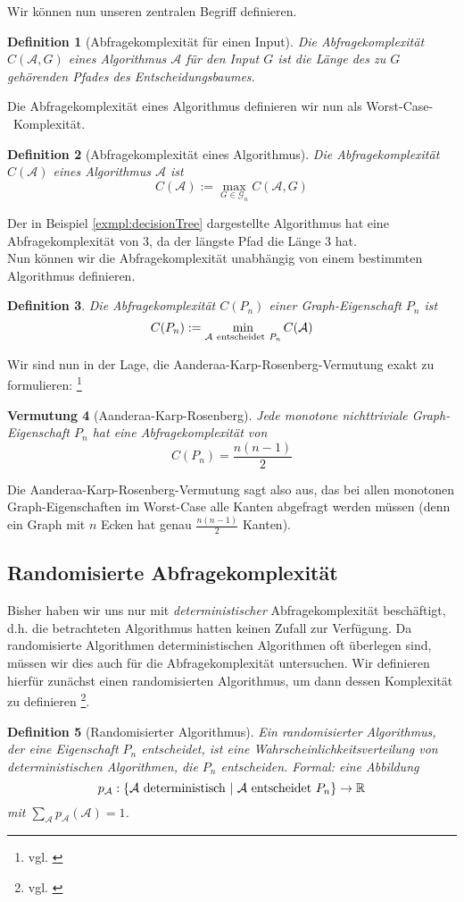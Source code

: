\documentclass[a4paper]{scrreprt}
\newtheorem{definition}{Definition}
\newtheorem{conjecture}[definition]{Vermutung}
\theoremstyle{definition}
\begin{document}
Wir können nun unseren zentralen Begriff definieren.
\begin{definition}[Abfragekomplexität für einen Input]
Die \emph{Abfragekomplexität} $C(\mathcal{A},G)$ eines
Algorithmus $\mathcal{A}$ für den Input $G$ ist
die Länge des zu $G$ gehörenden Pfades des
Entscheidungsbaumes.
\end{definition}
Die Abfragekomplexität eines Algorithmus definieren
wir nun als Worst-Case-~Komplexität.
\begin{definition}[Abfragekomplexität eines Algorithmus]
Die \emph{Abfragekomplexität} $C(\mathcal{A})$ eines
Algorithmus $\mathcal{A}$ ist
$$ C(\mathcal{A}) := \max_{G \in \mathcal{G}_n} C(\mathcal{A},G)$$
\end{definition}
Der in Beispiel \ref{exmpl:decisionTree} dargestellte
Algorithmus hat eine Abfragekomplexität von $3$, da
der längste Pfad die Länge $3$ hat. \\
Nun können wir die Abfragekomplexität unabhängig
von einem bestimmten Algorithmus definieren.
\begin{definition}
Die \emph{Abfragekomplexität} $C(P_n)$ einer Graph-Eigenschaft
$P_n$ ist
$$ C(P_n) := \min_{\mathcal{A} \ {\rm entscheidet}\  P_n} C(\mathcal{A})$$
\end{definition}

Wir sind nun in der Lage, die Aanderaa-Karp-Rosenberg-Vermutung
exakt zu formulieren:
\footnote{vgl. \cite{Lovasz}}
\begin{conjecture}[Aanderaa-Karp-Rosenberg]
Jede monotone nichttriviale Graph-Eigenschaft $P_n$
hat eine Abfragekomplexität von
$$C(P_n) = \frac{n(n-1)}{2}$$
\end{conjecture}
Die Aanderaa-Karp-Rosenberg-Vermutung sagt also aus,
das bei allen monotonen Graph-Eigenschaften im Worst-Case
alle Kanten abgefragt werden müssen (denn ein Graph mit
$n$ Ecken hat genau $\frac{n(n-1)}{2}$ Kanten).

\subsection{Randomisierte Abfragekomplexität}

Bisher haben wir uns nur mit \emph{deterministischer}
Abfragekomplexität beschäftigt, d.h. die betrachteten
Algorithmus hatten keinen Zufall zur Verfügung.
Da randomisierte Algorithmen deterministischen Algorithmen
oft überlegen sind, müssen wir dies auch für
die Abfragekomplexität untersuchen.
Wir definieren hierfür zunächst einen randomisierten
Algorithmus, um dann dessen Komplexität zu definieren
\footnote{vgl. \cite{Groeger}}.
\begin{definition}[Randomisierter Algorithmus]
Ein \emph{randomisierter Algorithmus}, der eine
Eigenschaft $P_n$ entscheidet, ist eine
Wahrscheinlichkeitsverteilung von deterministischen
Algorithmen, die $P_n$ entscheiden. Formal: eine Abbildung
$$ p_\mathcal{A}: \{ \mathcal{A} \ \textup {deterministisch} \ | \
         \mathcal{A} \ {\rm entscheidet} \ P_n \} \to \mathbb{R} $$
mit $\sum_\mathcal{A} p_\mathcal{A}(\mathcal{A}) = 1$.
\end{definition}
\end{document}
